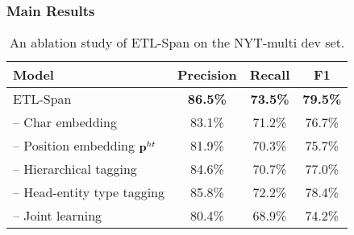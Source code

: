 \documentclass{ecai}
\begin{document}
\subsubsection{Main Results}

\begin{table}
\begin{center}
{\caption{ Comparison of test-time speed. Bat/s refers to the number of batches can be processed per second.}\label{tab:speed}}
\end{center}
\end{table} 

\begin{table}
\begin{center}
{\caption{An ablation study of ETL-Span on the NYT-multi dev set.}
\label{tab:ablation}}
\begin{tabular}{lccc}
  \toprule
      Model                & Precision & Recall & F1 \\
  \midrule
  ETL-Span                & \textbf{86.5\%} & \textbf{73.5\%} & \textbf{79.5\%}    \\
  \quad-- Char embedding  & 83.1\% & 71.2\% & 76.7\%   \\
\quad-- Position embedding $\boldsymbol{\rm{p}}^{ht}$  & 81.9\% & 70.3\% & 75.7\%    \\
  \quad-- Hierarchical tagging & 84.6\% & 70.7\% & 77.0\%    \\
  \quad-- Head-entity type tagging & 85.8\% & 72.2\% & 78.4\%    \\
    \quad-- Joint learning & 80.4\% & 68.9\% & 74.2\%    \\
  \bottomrule
\end{tabular}
\end{center}
\end{table}
\end{document}
